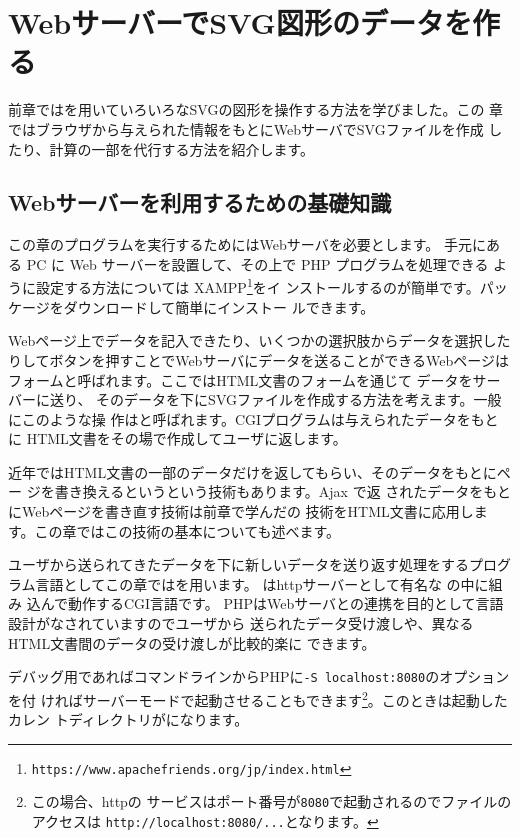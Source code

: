 \chapter{WebサーバーでSVG図形のデータを作る}\label{svgwithserver}
前章では\JS を用いていろいろなSVGの図形を操作する方法を学びました。この
章ではブラウザから与えられた情報をもとにWebサーバでSVGファイルを作成
したり、計算の一部を代行する方法を紹介します。
\section{Webサーバーを利用するための基礎知識}
この章のプログラムを実行するためにはWebサーバを必要とします。
手元にある PC に Web サーバーを設置して、その上で PHP プログラムを処理できる
ように設定する方法については
XAMPP\footnote{\texttt{https://www.apachefriends.org/jp/index.html}}をイ
ンストールするのが簡単です。パッケージをダウンロードして簡単にインストー
ルできます。

Webページ上でデータを記入できたり、いくつかの選択肢からデータを選択した
りしてボタンを押すことでWebサーバにデータを送ることができるWebページは
フォームと呼ばれます。ここではHTML文書のフォームを通じて
データをサーバーに送り、
そのデータを下にSVGファイルを作成する方法を考えます。一般にこのような操
作はと呼ばれます。CGIプログラムは与えられたデータをもとに
HTML文書をその場で作成してユーザに返します。

近年ではHTML文書の一部のデータだけを返してもらい、そのデータをもとにペー
ジを書き換えるというという技術もあります。Ajax で返
されたデータをもとにWebページを書き直す技術は前章で学んだの
技術をHTML文書に応用します。この章ではこの技術の基本についても述べます。

ユーザから送られてきたデータを下に新しいデータを送り返す処理をするプログ
ラム言語としてこの章ではを用います。
はhttpサーバーとして有名な
の中に組み
込んで動作するCGI言語です。
PHPはWebサーバとの連携を目的として言語設計がなされていますのでユーザから
送られたデータ受け渡しや、異なるHTML文書間のデータの受け渡しが比較的楽に
できます。

デバッグ用であればコマンドラインからPHPに\texttt{-S localhost:8080}のオプションを付
ければサーバーモードで起動させることもできます\footnote{この場合、httpの
サービスはポート番号が\texttt{8080}で起動されるのでファイルのアクセスは
\texttt{http://localhost:8080/...}となります。}。このときは起動したカレン
トディレクトリがになります。


